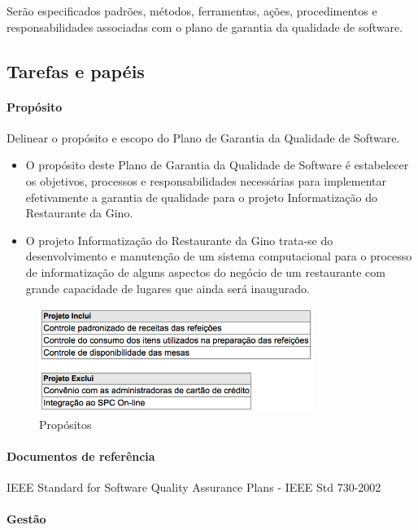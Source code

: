   Serão especificados padrões, métodos, ferramentas, ações, procedimentos e responsabilidades associadas com o plano de garantia da qualidade de software.

\subsection{Tarefas e papéis}

\paragraph{Propósito}
Delinear o propósito e escopo do Plano de Garantia da Qualidade de Software.

\begin{itemize}
\item O propósito deste Plano de Garantia da Qualidade de Software é estabelecer os objetivos, processos e responsabilidades necessárias para implementar efetivamente a garantia de qualidade para o projeto Informatização do Restaurante da Gino.

\item O projeto Informatização do Restaurante da Gino trata-se do desenvolvimento e manutenção de um sistema computacional para o processo de informatização de alguns aspectos do negócio de um restaurante com grande capacidade de lugares que ainda será inaugurado.
\end{itemize}


\begin{figure}[H]
  \centering
  \includegraphics[width=0.8\textwidth]{softwareengineer/images/definition-quality} 
  \caption{Propósitos}
  \label{fig:definition-quality} 
\end{figure}

\paragraph{Documentos de referência}

IEEE Standard for Software Quality Assurance Plans - IEEE Std 730-2002

\paragraph{Gestão}

